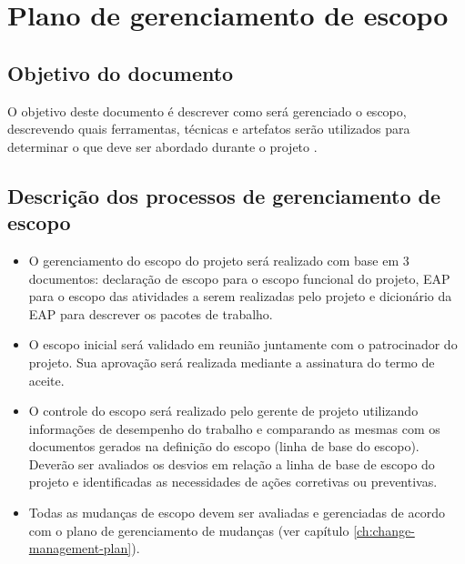 

\chapter{Plano de gerenciamento de escopo}

\section{Objetivo do documento}

O objetivo deste documento é descrever como será gerenciado o escopo, descrevendo quais ferramentas, técnicas e artefatos serão utilizados para determinar o que deve ser abordado durante o projeto \projectName{}.

\section{Descrição dos processos de gerenciamento de escopo}

\begin{itemize}
	\item O gerenciamento do escopo do projeto será realizado com base em 3 documentos: declaração de escopo para o escopo funcional do projeto, EAP para o escopo das atividades a serem realizadas pelo projeto e dicionário da EAP para descrever os pacotes de trabalho.
	\item O escopo inicial será validado em reunião juntamente com o patrocinador do projeto. Sua aprovação será realizada mediante a assinatura do termo de aceite.
	\item O controle do escopo será realizado pelo gerente de projeto utilizando informações de desempenho do trabalho e comparando as mesmas com os documentos gerados na definição do escopo (linha de base do escopo). Deverão ser avaliados os desvios em relação a linha de base de escopo do projeto e identificadas as necessidades de ações corretivas ou preventivas.
	\item Todas as mudanças de escopo devem ser avaliadas e gerenciadas de acordo com o plano de gerenciamento de mudanças (ver capítulo \ref{ch:change-management-plan}).
\end{itemize}

